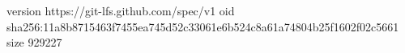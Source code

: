 version https://git-lfs.github.com/spec/v1
oid sha256:11a8b8715463f7455ea745d52c33061e6b524c8a61a74804b25f1602f02c5661
size 929227
